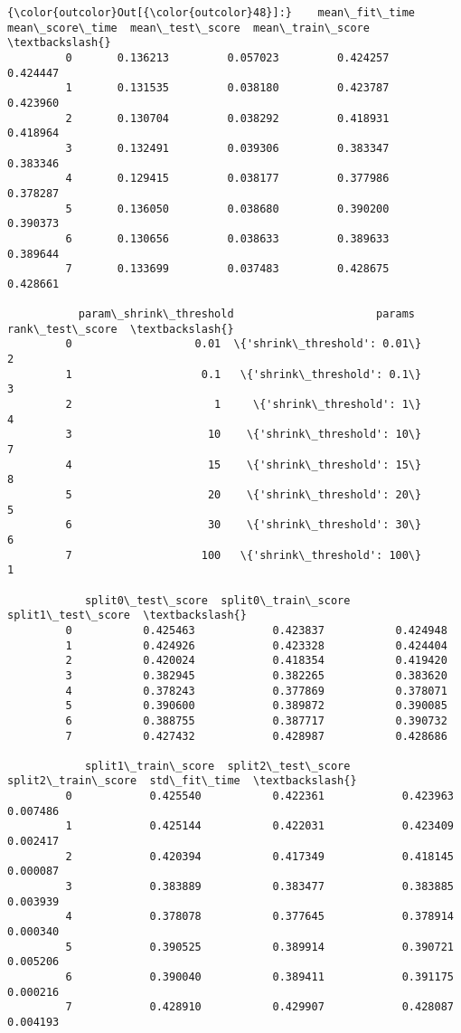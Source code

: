 \documentclass[11pt]{article}
\begin{document}
            \begin{Verbatim}[commandchars=\\\{\}]
{\color{outcolor}Out[{\color{outcolor}48}]:}    mean\_fit\_time  mean\_score\_time  mean\_test\_score  mean\_train\_score  \textbackslash{}
         0       0.136213         0.057023         0.424257          0.424447   
         1       0.131535         0.038180         0.423787          0.423960   
         2       0.130704         0.038292         0.418931          0.418964   
         3       0.132491         0.039306         0.383347          0.383346   
         4       0.129415         0.038177         0.377986          0.378287   
         5       0.136050         0.038680         0.390200          0.390373   
         6       0.130656         0.038633         0.389633          0.389644   
         7       0.133699         0.037483         0.428675          0.428661   
         
           param\_shrink\_threshold                      params  rank\_test\_score  \textbackslash{}
         0                   0.01  \{'shrink\_threshold': 0.01\}                2   
         1                    0.1   \{'shrink\_threshold': 0.1\}                3   
         2                      1     \{'shrink\_threshold': 1\}                4   
         3                     10    \{'shrink\_threshold': 10\}                7   
         4                     15    \{'shrink\_threshold': 15\}                8   
         5                     20    \{'shrink\_threshold': 20\}                5   
         6                     30    \{'shrink\_threshold': 30\}                6   
         7                    100   \{'shrink\_threshold': 100\}                1   
         
            split0\_test\_score  split0\_train\_score  split1\_test\_score  \textbackslash{}
         0           0.425463            0.423837           0.424948   
         1           0.424926            0.423328           0.424404   
         2           0.420024            0.418354           0.419420   
         3           0.382945            0.382265           0.383620   
         4           0.378243            0.377869           0.378071   
         5           0.390600            0.389872           0.390085   
         6           0.388755            0.387717           0.390732   
         7           0.427432            0.428987           0.428686   
         
            split1\_train\_score  split2\_test\_score  split2\_train\_score  std\_fit\_time  \textbackslash{}
         0            0.425540           0.422361            0.423963      0.007486   
         1            0.425144           0.422031            0.423409      0.002417   
         2            0.420394           0.417349            0.418145      0.000087   
         3            0.383889           0.383477            0.383885      0.003939   
         4            0.378078           0.377645            0.378914      0.000340   
         5            0.390525           0.389914            0.390721      0.005206   
         6            0.390040           0.389411            0.391175      0.000216   
         7            0.428910           0.429907            0.428087      0.004193   
         

\end{Verbatim}
\end{document}
